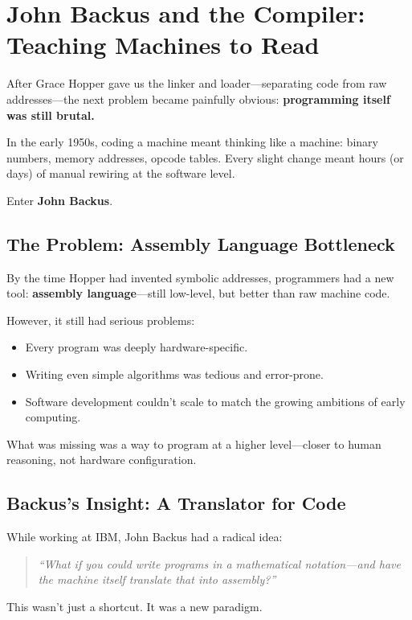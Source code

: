 \section{John Backus and the Compiler: Teaching Machines to Read}

After Grace Hopper gave us the linker and loader—separating code from raw addresses—the next problem became painfully obvious:
\textbf{programming itself was still brutal.}

In the early 1950s, coding a machine meant thinking like a machine:
binary numbers, memory addresses, opcode tables. Every slight change meant hours (or days) of manual rewiring at the software level.

Enter \textbf{John Backus}.

\subsection{The Problem: Assembly Language Bottleneck}

By the time Hopper had invented symbolic addresses, programmers had a new tool: \textbf{assembly language}—still low-level, but better than raw machine code.

However, it still had serious problems:

\begin{itemize} \item Every program was deeply hardware-specific. \item Writing even simple algorithms was tedious and error-prone. \item Software development couldn't scale to match the growing ambitions of early computing. \end{itemize}

What was missing was a way to program at a higher level—closer to human reasoning, not hardware configuration.

\subsection{Backus’s Insight: A Translator for Code}

While working at IBM, John Backus had a radical idea:

\begin{quote} \textit{``What if you could write programs in a mathematical notation—and have the machine itself translate that into assembly?''} \end{quote}

This wasn’t just a shortcut. It was a new paradigm.

